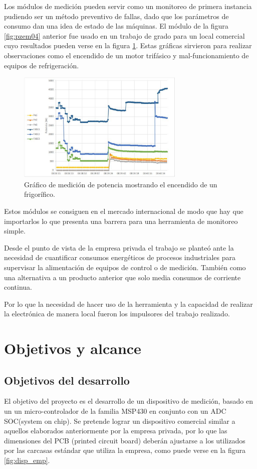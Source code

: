 Los módulos de medición pueden servir como un monitoreo de primera instancia pudiendo ser un método preventivo de fallas, dado que los parámetros de consumo dan una idea de estado de las máquinas.  El módulo de la figura \ref{fig:pzem04}  anterior fue usado en un trabajo de grado para un local comercial cuyo resultados pueden verse en la figura \ref{fig:graficoW}.  Estas gráficas sirvieron para realizar observaciones como el encendido de un motor trifásico y mal-funcionamiento de equipos de refrigeración.

\begin{figure}[h]
	\centering
	\includegraphics[width=80mm,keepaspectratio]{Figures/potencia_ej.png}
	\caption{Gráfico de medición de potencia mostrando el encendido de un frigorífico.}
	\label{fig:graficoW}
\end{figure}

Estos módulos se consiguen en el mercado internacional de modo que hay que importarlos lo que presenta una barrera para una herramienta de monitoreo simple. 

Desde el punto de vista de la empresa privada  el trabajo se planteó ante la necesidad de cuantificar consumos energéticos de procesos industriales para supervisar la alimentación de equipos de control o de medición. También como una alternativa a un producto anterior que solo media consumos de corriente continua. 

Por lo que la necesidad de hacer uso de la herramienta y la capacidad de realizar la electrónica de manera local  fueron los impulsores del trabajo realizado.

\section{Objetivos y alcance}

\subsection{Objetivos del desarrollo}
El objetivo del proyecto es el desarrollo de un dispositivo de medición, basado en un un micro-controlador de la familia MSP430 en conjunto con un ADC SOC(system on chip). Se pretende lograr un dispositivo comercial similar a aquellos elaborados anteriormente por la empresa privada, por lo que las dimensiones del PCB (printed circuit board) deberán ajustarse a los utilizados por las carcasas estándar que utiliza la empresa, como puede verse en la figura \ref{fig:disp_emp}.

